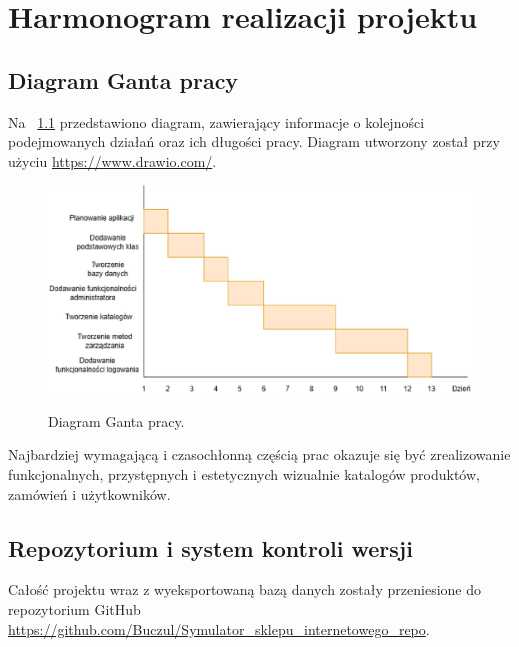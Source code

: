 \chapter{Harmonogram realizacji projektu}
\label{cha:harmonogram}

\section{Diagram Ganta pracy}

Na \figurename~\ref{fig6} przedstawiono diagram, zawierający informacje o kolejności podejmowanych działań oraz ich długości pracy.
Diagram utworzony został przy użyciu \url{https://www.drawio.com/}.
\begin{figure}[H]
    \centering
    \includegraphics[width=\linewidth]{figures/fig_0006.eps}\\
    \caption{Diagram Ganta pracy.\label{fig6}}
\end{figure}

Najbardziej wymagającą i czasochłonną częścią prac okazuje się być zrealizowanie funkcjonalnych, przystępnych i estetycznych wizualnie 
katalogów produktów, zamówień i użytkowników.

\section{Repozytorium i system kontroli wersji}
Całość projektu wraz z wyeksportowaną bazą danych zostały przeniesione do repozytorium GitHub \url{https://github.com/Buczul/Symulator_sklepu_internetowego_repo}.